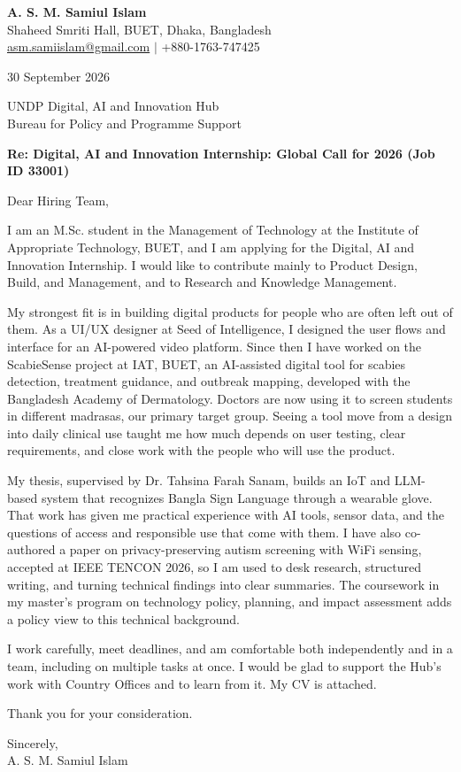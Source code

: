 \documentclass[11pt,a4paper]{article}
\begin{document}
{\large\bfseries A. S. M. Samiul Islam}\\
Shaheed Smriti Hall, BUET, Dhaka, Bangladesh\\
\href{mailto:asm.samiislam@gmail.com}{asm.samiislam@gmail.com} $|$ +880-1763-747425

30 September 2026

UNDP Digital, AI and Innovation Hub\\
Bureau for Policy and Programme Support

\textbf{Re: Digital, AI and Innovation Internship: Global Call for 2026 (Job ID 33001)}

Dear Hiring Team,

I am an M.Sc. student in the Management of Technology at the Institute of Appropriate Technology, BUET, and I am applying for the Digital, AI and Innovation Internship. I would like to contribute mainly to Product Design, Build, and Management, and to Research and Knowledge Management.

My strongest fit is in building digital products for people who are often left out of them. As a UI/UX designer at Seed of Intelligence, I designed the user flows and interface for an AI-powered video platform. Since then I have worked on the ScabieSense project at IAT, BUET, an AI-assisted digital tool for scabies detection, treatment guidance, and outbreak mapping, developed with the Bangladesh Academy of Dermatology. Doctors are now using it to screen students in different madrasas, our primary target group. Seeing a tool move from a design into daily clinical use taught me how much depends on user testing, clear requirements, and close work with the people who will use the product.

My thesis, supervised by Dr. Tahsina Farah Sanam, builds an IoT and LLM-based system that recognizes Bangla Sign Language through a wearable glove. That work has given me practical experience with AI tools, sensor data, and the questions of access and responsible use that come with them. I have also co-authored a paper on privacy-preserving autism screening with WiFi sensing, accepted at IEEE TENCON 2026, so I am used to desk research, structured writing, and turning technical findings into clear summaries. The coursework in my master's program on technology policy, planning, and impact assessment adds a policy view to this technical background.

I work carefully, meet deadlines, and am comfortable both independently and in a team, including on multiple tasks at once. I would be glad to support the Hub's work with Country Offices and to learn from it. My CV is attached.

Thank you for your consideration.

Sincerely,\\
A. S. M. Samiul Islam
\end{document}
